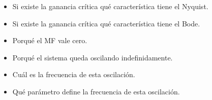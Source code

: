 \begin{itemize}
  \item Si existe la ganancia crítica qué característica tiene el Nyquist.
  \item Si existe la ganancia crítica qué característica tiene el Bode.
  \item Porqué el MF vale cero.
  \item Porqué el sistema queda oscilando indefinidamente.
  \item Cuál es la frecuencia de esta oscilación.
  \item Qué parámetro define la frecuencia de esta oscilación.
\end{itemize}
